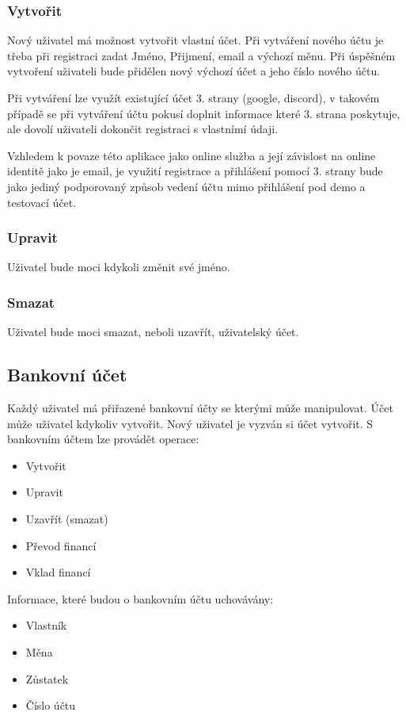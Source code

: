 \documentclass[FM,SP]{tulthesis}
\begin{document}
\subsubsection{Vytvořit}

Nový uživatel má možnost vytvořit vlastní účet. Při vytváření nového účtu je třeba při registraci zadat Jméno, Přijmení, email a výchozí měnu.
Při úspěšném vytvoření uživateli bude přidělen nový výchozí účet a jeho číslo nového účtu.

Při vytváření lze využít existující účet 3. strany (google, discord), v takovém případě se při vytváření účtu pokusí doplnit informace které 3. strana poskytuje, ale dovolí uživateli dokončit registraci s vlastnímí údaji.

Vzhledem k povaze této aplikace jako online služba a její závislost na online identitě jako je email, je využití registrace a přihlášení pomocí 3. strany bude jako jediný podporovaný způsob vedení účtu mimo přihlášení pod demo a testovací účet.

\subsubsection{Upravit}

Uživatel bude moci kdykoli změnit své jméno.

\subsubsection{Smazat}

Uživatel bude moci smazat, neboli uzavřít, uživatelský účet.

\subsection{Bankovní účet}
Každý uživatel má přiřazené bankovní účty se kterými může manipulovat. Účet může uživatel kdykoliv vytvořit. Nový uživatel je vyzván si účet vytvořit.
S bankovním účtem lze provádět operace:
\begin{itemize}
    \item Vytvořit
    \item Upravit
    \item Uzavřít (smazat)
    \item Převod financí
    \item Vklad financí
\end{itemize}

Informace, které budou o bankovním účtu uchovávány:
\begin{itemize}
    \item Vlastník
    \item Měna
    \item Zůstatek
    \item Číslo účtu

\end{itemize}
\end{document}
